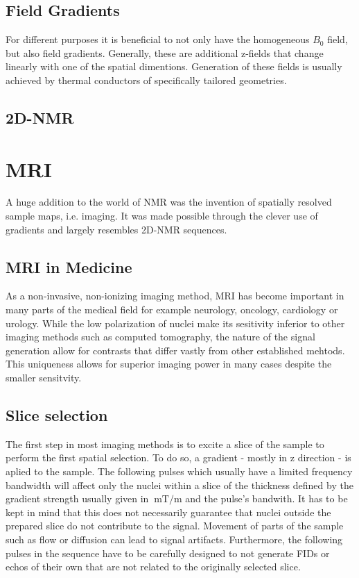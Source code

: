         \subsection{Field Gradients}
        For different purposes it is beneficial to not only have the homogeneous $B_0$ field, but
        also field gradients. Generally, these are additional z-fields that change linearly with one
        of the spatial dimentions. Generation of these fields is usually achieved by thermal
        conductors of specifically tailored geometries.
        \subsection{2D-NMR}

    \section{MRI}
        A huge addition to the world of NMR was the invention of spatially resolved sample maps,
        i.e. imaging. It was made possible through the clever use of gradients and largely resembles
        2D-NMR sequences.
        \subsection{MRI in Medicine}
            As a non-invasive, non-ionizing imaging method, MRI has become important in many parts
            of the medical field for example neurology, oncology, cardiology or urology. While the
            low polarization of nuclei make its sesitivity inferior to other imaging methods such as
            computed tomography, the nature of the signal generation allow for contrasts that differ
            vastly from other established mehtods. This uniqueness allows for superior imaging power
            in many cases despite the smaller sensitvity.
        \subsection{Slice selection}
            The first step in most imaging methods is to excite a slice of the sample to perform the
            first spatial selection. To do so, a gradient - mostly in z direction - is aplied to the
            sample. The following pulses which usually have a limited frequency bandwidth will
            affect only the nuclei within a slice of the thickness defined by the gradient strength
            usually given in $\SI{}{\milli\tesla\per\meter}$ and the pulse's bandwith. It has to be
            kept in mind that this does not necessarily guarantee that nuclei outside the prepared
            slice do not contribute to the signal. Movement of parts of the sample such as flow or
            diffusion can lead to signal artifacts. Furthermore, the following pulses in the
            sequence have to be carefully designed to not generate FIDs or echos of their own that
            are not related to the originally selected slice.
